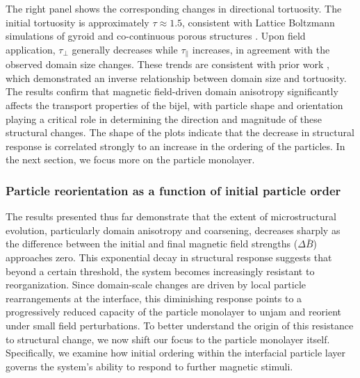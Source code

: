 The right panel shows the corresponding changes in directional tortuosity. The initial tortuosity is approximately \(\tau \approx 1.5\), consistent with 
Lattice Boltzmann simulations of gyroid and co-continuous porous structures \cite{luo_macroscopic_2020}. Upon field application, \(\tau_\perp\) 
generally decreases while \(\tau_\parallel\) increases, in agreement with the observed domain size changes. These trends are consistent with prior 
work \cite{karthikeyan_formation_2024}, which demonstrated an inverse relationship between domain size and tortuosity. The results confirm that 
magnetic field-driven domain anisotropy significantly affects the transport properties of the bijel, with particle shape and orientation playing a 
critical role in determining the direction and magnitude of these structural changes. The shape of the plots indicate that the decrease in structural response
is correlated strongly to an increase in the ordering of the particles. In the next section, we focus more on the particle monolayer.

\subsubsection{Particle reorientation as a function of initial particle order}

The results presented thus far demonstrate that the extent of microstructural evolution, particularly domain anisotropy and coarsening, decreases sharply 
as the difference between the initial and final magnetic field strengths (\(\Delta \bar{B}\)) approaches zero. This exponential decay in structural 
response suggests that beyond a certain threshold, the system becomes increasingly resistant to reorganization. Since domain-scale changes are driven 
by local particle rearrangements at the interface, this diminishing response points to a progressively reduced capacity of the particle monolayer to 
unjam and reorient under small field perturbations. To better understand the origin of this resistance to structural change, we now shift our focus to 
the particle monolayer itself. Specifically, we examine how initial ordering within the interfacial particle layer governs the system's ability to respond 
to further magnetic stimuli.

